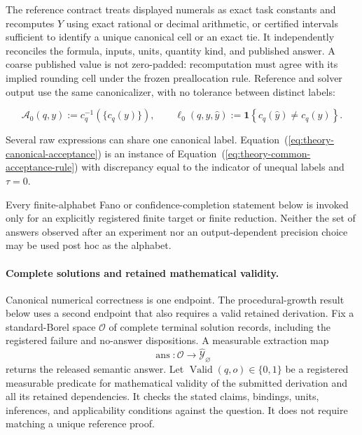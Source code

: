 \documentclass[10pt]{article} %
\renewcommand{\eqref}[1]{\textup{(\ref{#1})}}
\providecommand{\1}{\mathbf{1}}  %
\theoremstyle{remark}
\theoremstyle{definition}
\begin{document}
The reference contract treats displayed numerals as exact task constants
and recomputes $Y$ using exact rational or decimal arithmetic, or
certified intervals sufficient to identify a unique canonical cell or
an exact tie. It independently reconciles the formula, inputs, units,
quantity kind, and published answer. A coarse published value is not
zero-padded: recomputation must agree with its implied rounding cell
under the frozen preallocation rule. Reference and solver output use the
same canonicalizer, with no tolerance between distinct labels:

\begin{equation}
\mathcal A_0(q,y)
:=
c_q^{-1}\!\left(\{c_q(y)\}\right),
\qquad
\ell_0(q,y,\widehat y)
:=
\mathbf 1\!\left\{c_q(\widehat y)\neq c_q(y)\right\}.
\label{eq:theory-canonical-acceptance}
\end{equation}

Several raw expressions can share one canonical label. Equation~\eqref{eq:theory-canonical-acceptance}
is an instance of Equation~\eqref{eq:theory-common-acceptance-rule} with
discrepancy equal to the indicator of unequal labels and $\tau=0$.

Every finite-alphabet Fano or confidence-completion statement below is invoked only for an explicitly registered finite target or finite reduction. Neither the set of answers observed after an experiment nor an output-dependent precision choice may be used post hoc as the alphabet.

\paragraph{Complete solutions and retained mathematical validity.}

Canonical numerical correctness is one endpoint. The procedural-growth
result below uses a second endpoint that also requires a valid retained
derivation. Fix a standard-Borel space $\mathcal O$ of complete terminal
solution records, including the registered failure and no-answer
dispositions. A measurable extraction map
\[
\operatorname{ans}:\mathcal O\longrightarrow
\widehat{\mathcal Y}_{\varnothing}
\]
returns the released semantic answer. Let
$\operatorname{Valid}(q,o)\in\{0,1\}$ be a registered measurable predicate
for mathematical validity of the submitted derivation and all its
retained dependencies. It checks the stated claims, bindings, units,
inferences, and applicability conditions against the question. It does
not require matching a unique reference proof.
\end{document}
